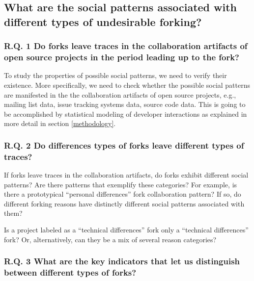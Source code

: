 \documentclass{acm_proc_article-sp}
\begin{document}
\subsection*{What are the social patterns associated with different types of undesirable forking?\\}

\subsubsection*{R.Q. 1 \hspace{4 mm} Do forks leave traces in the collaboration artifacts of open source projects in the period leading up to the fork?\\}

To study the properties of possible social patterns, we need to verify their existence. More specifically, we need to check whether the possible social patterns are manifested in the the collaboration artifacts of open source projects, e.g., mailing list data, issue tracking systems data, source code data. This is going to be accomplished by statistical modeling of developer interactions as explained in more detail in section \ref{methodology}.

\subsubsection*{R.Q. 2 \hspace{4 mm} Do differences types of forks leave different types of traces?\\}

If forks leave traces in the collaboration artifacts, do forks exhibit different social patterns? Are there patterns that exemplify these categories? For example, is there a prototypical ``personal differences'' fork collaboration pattern? If so, do different forking reasons have distinctly different social patterns associated with them? 

Is a project labeled as a ``technical differences'' fork only a ``technical differences'' fork? Or, alternatively, can they be a mix of several reason categories?

\subsubsection*{R.Q. 3 \hspace{4 mm} What are the key indicators that let us distinguish between different types of forks?\\}
\end{document}
